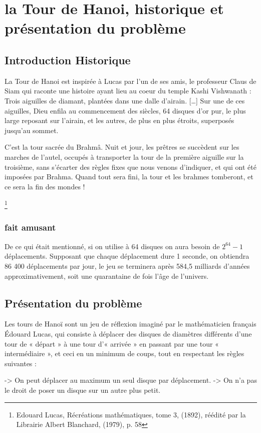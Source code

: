 \chapter{la Tour de Hanoi, historique et présentation du problème}

\section{Introduction Historique}
La Tour de Hanoi est inspirée à Lucas par l’un de ses amis, le professeur Claus de Siam qui raconte une histoire ayant lieu au coeur du temple Kashi Vishwanath :
Trois aiguilles de diamant, plantées dans une dalle d’airain. […] Sur une de ces aiguilles, Dieu enfila au commencement des siècles, 64 disques d’or pur, le plus large reposant sur l’airain, et les autres, de plus en plus étroits, superposés jusqu’au sommet.

C’est la tour sacrée du Brahmâ. Nuit et jour, les prêtres se succèdent sur les marches de l’autel, occupés à transporter la tour de la première aiguille sur la troisième, sans s’écarter des règles fixes que nous venons d’indiquer, et qui ont été imposées par Brahma. Quand tout sera fini, la tour et les brahmes tomberont, et ce sera la fin des mondes !

\footnote{Edouard Lucas, Récréations mathématiques, tome 3, (1892), réédité par la Librairie Albert Blanchard, (1979), p. 58}
\subsection{fait amusant}
De ce qui était mentionné, si on utilise à 64 disques on aura besoin de $2^{64}-1$ déplacements. Supposant que chaque déplacement dure 1 seconde, on obtiendra 86 400 déplacements par jour, le jeu se terminera après 584,5 milliards d'années approximativement, soit une quarantaine de fois l'âge de l'univers.

\section{Présentation du problème}
Les tours de Hanoï sont un jeu de réflexion imaginé par le mathématicien français Édouard Lucas, qui consiste à déplacer des disques de diamètres différents d'une tour de « départ » à une tour d'« arrivée » en passant par une tour « intermédiaire », et ceci en un minimum de coups, tout en respectant les règles suivantes :

-> On peut déplacer au maximum un seul disque par déplacement.
-> On n'a pas le droit de poser un disque sur un autre plus petit.

